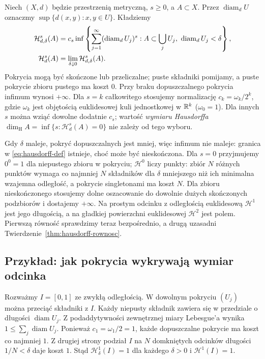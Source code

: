 \begin{definicja}
\label{def:miara-hausdorffa}
Niech $(X,d)$ będzie przestrzenią metryczną,
$s\geq0$, a $A\subset X$.
Przez $\operatorname{diam}_d U$ oznaczmy
$\sup\{d(x,y):x,y\in U\}$. Kładziemy
\begin{align}\label{eq:hausdorff-def}
 \mathcal H^s_{d,\delta}(A)
 &=c_s\inf\left\{
       \sum_{j=1}^{\infty}(\operatorname{diam}_d U_j)^s:
       A\subset\bigcup_j U_j,\
       \operatorname{diam}_d U_j<\delta\right\},\\
 \mathcal H^s_d(A)
 &=\lim_{\delta\downarrow0}
                  \mathcal H^s_{d,\delta}(A).
 \notag
\end{align}
Pokrycia mogą być skończone lub przeliczalne;
puste składniki pomijamy, a puste pokrycie zbioru
pustego ma koszt $0$. Przy braku dopuszczalnego
pokrycia infimum wynosi $+\infty$.
Dla $s=k$ całkowitego stosujemy normalizację
$c_k=\omega_k/2^k$, gdzie $\omega_k$
jest objętością euklidesowej kuli jednostkowej
w $\mathbb{R}^k$ ($\omega_0=1$). Dla innych $s$
można wziąć dowolne dodatnie $c_s$;
wartość \emph{wymiaru Hausdorffa}
$\dim_{\mathrm H}A
=\inf\{s:\mathcal H^s_d(A)=0\}$
nie zależy od tego wyboru.
\end{definicja}

Gdy $\delta$ maleje, pokryć dopuszczalnych
jest mniej, więc infimum nie maleje:
granica w \eqref{eq:hausdorff-def} istnieje,
choć może być nieskończona.
Dla $s=0$ przyjmujemy $0^0=1$ dla
niepustego zbioru w pokryciu;
$\mathcal H^0$ liczy punkty: zbiór $N$ różnych punktów
wymaga co najmniej $N$ składników dla $\delta$ mniejszego
niż ich minimalna wzajemna odległość, a pokrycie
singletonami ma koszt $N$. Dla zbioru nieskończonego
stosujemy dolne oszacowanie do dowolnie dużych
skończonych podzbiorów i dostajemy $+\infty$.
Na prostym odcinku z odległością euklidesową $\mathcal H^1$ jest
jego długością, a na gładkiej powierzchni euklidesowej
$\mathcal H^2$ jest polem. Pierwszą równość sprawdzimy
teraz bezpośrednio, a drugą uzasadni
Twierdzenie~\ref{thm:hausdorff-rownosc}.

\subsection*{Przykład: jak pokrycia wykrywają wymiar odcinka}

Rozważmy $I=[0,1]$ ze zwykłą odległością.
W dowolnym pokryciu $(U_j)$ można przeciąć składniki z $I$.
Każdy niepusty składnik zawiera się w przedziale
o długości $\operatorname{diam}U_j$.
Z podaddytywności zewnętrznej miary Lebesgue'a wynika
$1\leq\sum_j\operatorname{diam}U_j$.
Ponieważ $c_1=\omega_1/2=1$, każde dopuszczalne pokrycie
ma koszt co najmniej $1$.
Z drugiej strony podział $I$ na $N$ domkniętych
odcinków długości $1/N<\delta$ daje koszt $1$.
Stąd $\mathcal H^1_\delta(I)=1$ dla każdego $\delta>0$
i $\mathcal H^1(I)=1$.

